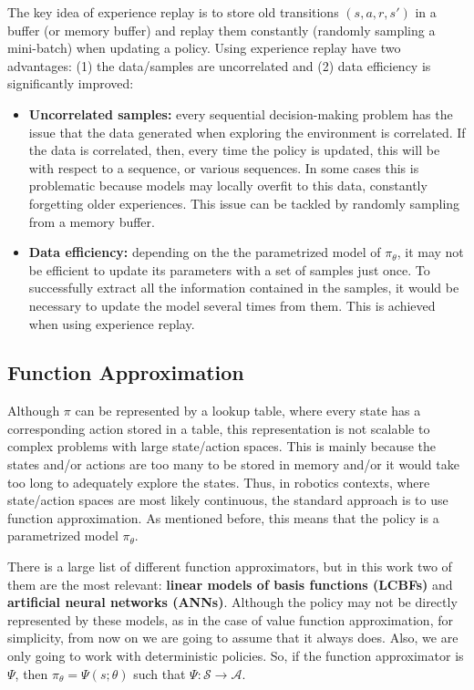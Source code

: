 The key idea of experience replay is to store old transitions $(s, a, r, s')$ in a buffer (or memory buffer) and replay them constantly (randomly sampling a mini-batch) when updating a policy. Using experience replay have two advantages: (1) the data/samples are uncorrelated and (2) data efficiency is significantly improved:

\begin{itemize}
    \item \textbf{Uncorrelated samples:} every sequential decision-making problem has the issue that the data generated when exploring the environment is correlated. If the data is correlated, then, every time the policy is updated, this will be with respect to a sequence, or various sequences. In some cases this is problematic because models may locally overfit to this data, constantly forgetting older experiences. This issue can be tackled by randomly sampling from a memory buffer.
    
    \item\textbf{Data efficiency:} depending on the the parametrized model of $\pi_{\theta}$, it may not be efficient to update its parameters with a set of samples just once. To successfully extract all the information contained in the samples, it would be necessary to update the model several times from them. This is achieved when using experience replay.
\end{itemize}

\subsection{Function Approximation}
Although $\pi$ can be represented by a lookup table, where every state has a corresponding action stored in a table, this representation is not scalable to complex problems with large state/action spaces. This is mainly because the states and/or actions are too many to be stored in memory and/or it would take too long to adequately explore the states. Thus, in robotics contexts, where state/action spaces are most likely continuous, the standard approach is to use function approximation. As mentioned before, this means that the policy is a parametrized model $\pi_{\theta}$.

There is a large list of different function approximators, but in this work two of them are the most relevant: \textbf{linear models of basis functions (LCBFs)} and \textbf{artificial neural networks (ANNs)}. Although the policy may not be directly represented by these models, as in the case of value function approximation, for simplicity, from now on we are going to assume that it always does. Also, we are only going to work with deterministic policies. So, if the function approximator is $\Psi$, then $\pi_{\theta} = \Psi(s;\theta)$ such that $\Psi: \mathcal{S} \to \mathcal{A}$.

